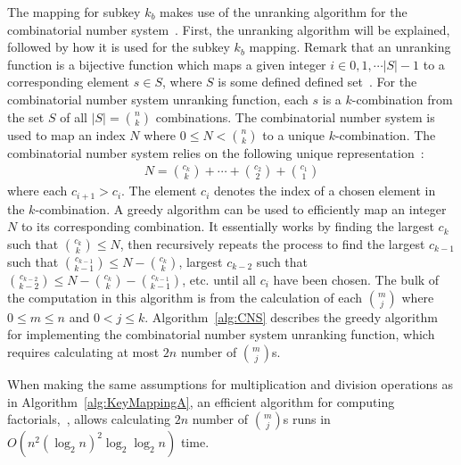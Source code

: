 The mapping for subkey $k_b$ makes use of the unranking algorithm for the combinatorial number system~\cite{CNSlectureNotes}. First, the unranking algorithm will be explained, followed by how it is used for the subkey $k_b$ mapping. Remark that an unranking function is a bijective function which maps a given integer $i \in {0, 1, \cdots \lvert S \rvert - 1}$ to a corresponding element $s \in S$, where $S$ is some defined defined set~\cite{shimizu2014unranking}. For the combinatorial number system unranking function, each $s$ is a $k$-combination from the set $S$ of all $\lvert S \rvert = {n \choose k}$ combinations. The combinatorial number system is used to map an index $N$ where $0 \leq N < {n \choose k}$ to a unique $k$-combination. The combinatorial number system relies on the following unique representation~\cite{siddique2016proof}:
\begin{align}
N={c_{k} \choose k}+\cdots+{c_{2} \choose 2}+{c_{1} \choose 1}
\end{align}
where each $c_{i+1} > c_i$. The element $c_i$ denotes the index of a chosen element in the $k$-combination. A greedy algorithm can be used to efficiently map an integer $N$ to its corresponding combination. It essentially works by finding the largest $c_k$ such that ${c_k \choose k} \leq N$, then recursively repeats the process to find the largest $c_{k-1}$ such that ${c_{k-1} \choose k-1} \leq N - {c_k \choose k}$, largest $c_{k-2}$ such that ${c_{k-2} \choose k-2} \leq N - {c_k \choose k} - {c_{k-1} \choose k-1}$, etc. until all $c_i$ have been chosen. The bulk of the computation in this algorithm is from the calculation of each ${m \choose j}$ where $0 \leq m \leq n$ and $0 < j \leq k$. Algorithm~\ref{alg:CNS} describes the greedy algorithm for implementing the combinatorial number system unranking function, which requires calculating at most $2n$ number of ${m \choose j}$s.
\begin{theorem}
When making the same assumptions for multiplication and division operations as in Algorithm~\ref{alg:KeyMappingA}, an efficient algorithm for computing factorials,~\cite{borwein1985complexity}, allows calculating $2n$ number of ${m \choose j}$s runs in $O\left(n^2 (\log_2 n)^2 \log_2\log_2 n\right)$ time.
\end{theorem}
